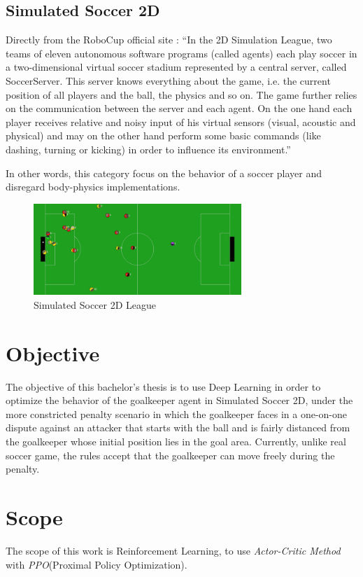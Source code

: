 \subsection{Simulated Soccer 2D}
Directly from the RoboCup official site \cite{RoboCup}: ``In the 2D Simulation League, two teams of eleven autonomous software programs (called agents) each play soccer in a two-dimensional virtual soccer stadium represented by a central server, called SoccerServer. This server knows everything about the game, i.e. the current position of all players and the ball, the physics and so on. The game further relies on the communication between the server and each agent. On the one hand each player receives relative and noisy input of his virtual sensors (visual, acoustic and physical) and may on the other hand perform some basic commands (like dashing, turning or kicking) in order to influence its environment.''

In other words, this category focus on the behavior of a soccer player and disregard body-physics implementations.

\begin{figure}[h]
	\centering
	\includegraphics[width=0.7\textwidth]{Cap1/Soccer2D}
	\caption{Simulated Soccer 2D League}
	\label{Soccer2D}
\end{figure}

\section{Objective}
The objective of this bachelor's thesis is to use Deep Learning in order to optimize  the behavior of the goalkeeper  agent in Simulated Soccer 2D, under the more constricted penalty scenario in which the goalkeeper faces in a one-on-one dispute against  an attacker  that starts with  the ball and is fairly distanced from the goalkeeper whose initial position lies in the goal area. Currently, unlike real soccer game, the rules accept that the goalkeeper can move freely during the penalty.

\section{Scope}
The scope of this work is Reinforcement Learning, to use  \textit{Actor-Critic Method} with \textit{PPO}(Proximal Policy Optimization). 

